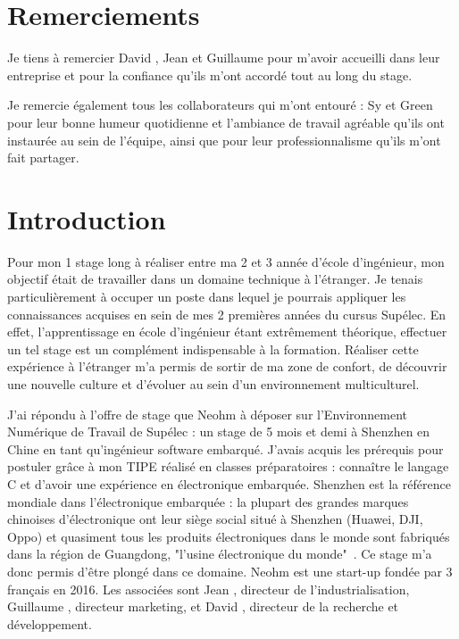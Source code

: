 \documentclass[a4paper, 12pt, sffamily]{report}
\begin{document}
\renewcommand{\contentsname}{Sommaire} %

\tableofcontents

\chapter*{Remerciements}

Je tiens à remercier David , Jean  et Guillaume  pour m’avoir accueilli dans leur entreprise et pour la confiance qu'ils m'ont accordé tout au long du stage.

Je remercie également tous les collaborateurs qui m’ont entouré : Sy et Green pour leur bonne humeur quotidienne et l’ambiance de travail agréable qu’ils ont instaurée au sein de l'équipe, ainsi que pour leur professionnalisme qu’ils m’ont fait partager.

\chapter{Introduction}
Pour mon 1\ier{} stage long à réaliser entre ma 2\ieme{} et 3\ieme{} année d’école d’ingénieur, mon objectif était de travailler dans un domaine technique à l’étranger. Je tenais particulièrement à occuper un poste dans lequel je pourrais appliquer les connaissances acquises en sein de mes 2 premières années du cursus Supélec. En effet, l’apprentissage en école d’ingénieur étant extrêmement théorique, effectuer un tel stage est un complément indispensable à la formation. Réaliser cette expérience à l'étranger m'a permis de sortir de ma zone de confort, de découvrir une nouvelle culture et d’évoluer au sein d’un environnement multiculturel.

J’ai répondu à l’offre de stage que Neohm à déposer sur l’Environnement Numérique de Travail de Supélec : un stage de 5 mois et demi à Shenzhen en Chine en tant qu’ingénieur software embarqué. J’avais acquis les prérequis pour postuler grâce à mon TIPE réalisé en classes préparatoires : connaître le langage C et d’avoir une expérience en électronique embarquée. Shenzhen est la référence mondiale dans l’électronique embarquée : la plupart des grandes marques chinoises d’électronique ont leur siège social situé à Shenzhen (Huawei, DJI, Oppo) et quasiment tous les produits électroniques dans le monde sont fabriqués dans la région de Guangdong, "l'usine électronique du monde"~\cite{article_shenzhen}. Ce stage m’a donc permis d’être plongé dans ce domaine. Neohm est une start-up fondée par 3 français en 2016. Les associées sont Jean , directeur de l’industrialisation, Guillaume , directeur marketing, et David , directeur de la recherche et développement.
\end{document}
